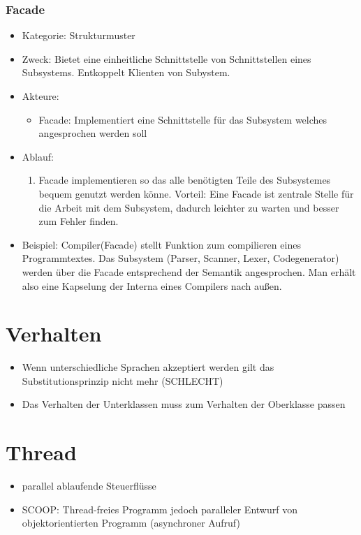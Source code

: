 \documentclass[11pt, fleqn, a4paper, leqno]{scrartcl} %
\begin{document}
		\subsubsection{Facade}
			\begin{itemize}
				\item Kategorie: Strukturmuster
				\item Zweck: Bietet eine einheitliche Schnittstelle von Schnittstellen eines Subsystems. Entkoppelt Klienten von Subystem.
				\item Akteure: 
					\begin{itemize}
						\item Facade: Implementiert eine Schnittstelle für das Subsystem welches angesprochen werden soll
					\end{itemize}
				\item Ablauf:
					\begin{enumerate}
						\item Facade implementieren so das alle benötigten Teile des Subsystemes bequem genutzt werden könne. Vorteil: Eine Facade ist zentrale Stelle für die Arbeit mit dem Subsystem, dadurch leichter zu warten und besser zum Fehler finden.
					\end{enumerate}
				\item Beispiel: Compiler(Facade) stellt Funktion zum compilieren eines Programmtextes. Das Subsystem (Parser, Scanner, Lexer, Codegenerator) werden über die Facade entsprechend der Semantik angesprochen. Man erhält also eine Kapselung der Interna eines Compilers nach außen. 
			\end{itemize}
	\section{Verhalten}
		\begin{itemize}
			\item Wenn unterschiedliche Sprachen akzeptiert werden gilt das Substitutionsprinzip nicht mehr (SCHLECHT)
			\item Das Verhalten der Unterklassen muss zum Verhalten der Oberklasse passen
		\end{itemize}
	\section{Thread}
		\begin{itemize}
			\item parallel ablaufende Steuerflüsse
			\item SCOOP: Thread-freies Programm jedoch paralleler Entwurf von objektorientierten Programm (asynchroner Aufruf)
		\end{itemize}
\end{document}
